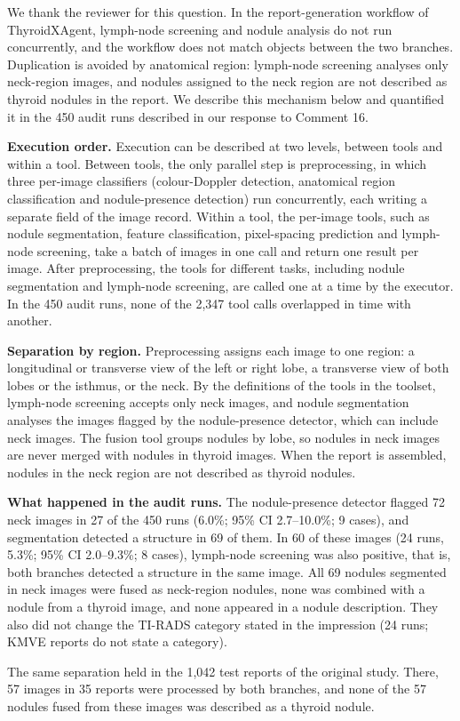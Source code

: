 We thank the reviewer for this question. In the report-generation workflow of ThyroidXAgent, lymph-node screening and nodule analysis do not run concurrently, and the workflow does not match objects between the two branches. Duplication is avoided by anatomical region: lymph-node screening analyses only neck-region images, and nodules assigned to the neck region are not described as thyroid nodules in the report. We describe this mechanism below and quantified it in the 450 audit runs described in our response to Comment 16.\par

\textbf{Execution order.} Execution can be described at two levels, between tools and within a tool. Between tools, the only parallel step is preprocessing, in which three per-image classifiers (colour-Doppler detection, anatomical region classification and nodule-presence detection) run concurrently, each writing a separate field of the image record. Within a tool, the per-image tools, such as nodule segmentation, feature classification, pixel-spacing prediction and lymph-node screening, take a batch of images in one call and return one result per image. After preprocessing, the tools for different tasks, including nodule segmentation and lymph-node screening, are called one at a time by the executor. In the 450 audit runs, none of the 2,347 tool calls overlapped in time with another.\par

\textbf{Separation by region.} Preprocessing assigns each image to one region: a longitudinal or transverse view of the left or right lobe, a transverse view of both lobes or the isthmus, or the neck. By the definitions of the tools in the toolset, lymph-node screening accepts only neck images, and nodule segmentation analyses the images flagged by the nodule-presence detector, which can include neck images. The fusion tool groups nodules by lobe, so nodules in neck images are never merged with nodules in thyroid images. When the report is assembled, nodules in the neck region are not described as thyroid nodules.\par

\textbf{What happened in the audit runs.} The nodule-presence detector flagged 72 neck images in 27 of the 450 runs (6.0\%; 95\% CI 2.7--10.0\%; 9 cases), and segmentation detected a structure in 69 of them. In 60 of these images (24 runs, 5.3\%; 95\% CI 2.0--9.3\%; 8 cases), lymph-node screening was also positive, that is, both branches detected a structure in the same image. All 69 nodules segmented in neck images were fused as neck-region nodules, none was combined with a nodule from a thyroid image, and none appeared in a nodule description. They also did not change the TI-RADS category stated in the impression (24 runs; KMVE reports do not state a category).\par

The same separation held in the 1,042 test reports of the original study. There, 57 images in 35 reports were processed by both branches, and none of the 57 nodules fused from these images was described as a thyroid nodule.\par
